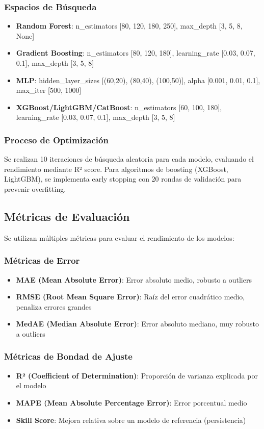 \documentclass[conference]{IEEEtran}
\begin{document}
	\subsubsection{Espacios de Búsqueda}
	\begin{itemize}
		\item \textbf{Random Forest}: n\_estimators [80, 120, 180, 250], max\_depth [3, 5, 8, None]
		\item \textbf{Gradient Boosting}: n\_estimators [80, 120, 180], learning\_rate [0.03, 0.07, 0.1], max\_depth [3, 5, 8]
		\item \textbf{MLP}: hidden\_layer\_sizes [(60,20), (80,40), (100,50)], alpha [0.001, 0.01, 0.1], max\_iter [500, 1000]
		\item \textbf{XGBoost/LightGBM/CatBoost}: n\_estimators [60, 100, 180], learning\_rate [0.03, 0.07, 0.1], max\_depth [3, 5, 8]
	\end{itemize}
	
	\subsubsection{Proceso de Optimización}
	Se realizan 10 iteraciones de búsqueda aleatoria para cada modelo, evaluando el rendimiento mediante R² score. Para algoritmos de boosting (XGBoost, LightGBM), se implementa early stopping con 20 rondas de validación para prevenir overfitting.
	
	\subsection{Métricas de Evaluación}
	Se utilizan múltiples métricas para evaluar el rendimiento de los modelos:
	
	\subsubsection{Métricas de Error}
	\begin{itemize}
		\item \textbf{MAE (Mean Absolute Error)}: Error absoluto medio, robusto a outliers
		\item \textbf{RMSE (Root Mean Square Error)}: Raíz del error cuadrático medio, penaliza errores grandes
		\item \textbf{MedAE (Median Absolute Error)}: Error absoluto mediano, muy robusto a outliers
	\end{itemize}
	
	\subsubsection{Métricas de Bondad de Ajuste}
	\begin{itemize}
		\item \textbf{R² (Coefficient of Determination)}: Proporción de varianza explicada por el modelo
		\item \textbf{MAPE (Mean Absolute Percentage Error)}: Error porcentual medio
		\item \textbf{Skill Score}: Mejora relativa sobre un modelo de referencia (persistencia)
	\end{itemize}
	
\end{document}
